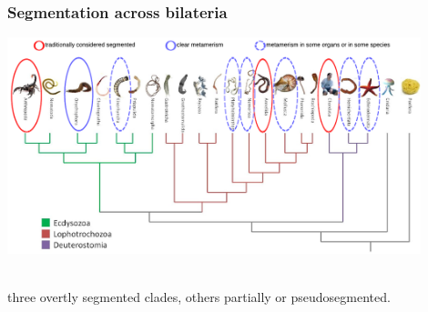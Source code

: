 \documentclass[compress]{beamer}
\begin{document}
\begin{frame}
    \frametitle{Segmentation across bilateria}
   \begin{center}
     \includegraphics[width=0.9\textwidth]{figures/tree_animals.pdf}
     \\~\\
   \end{center}
   three overtly segmented clades, others partially or pseudosegmented.
\end{frame}
\end{document}
